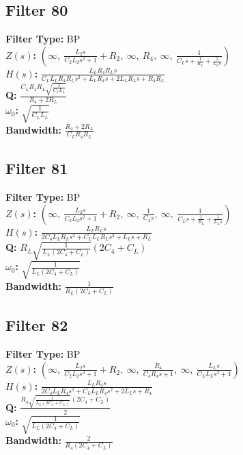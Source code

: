 \documentclass{article}
\begin{document}
\subsection*{Filter 80}
\textbf{Filter Type:} BP \\ 
\textbf{$Z(s)$:} $\left( \infty, \  \frac{L_{2} s}{C_{2} L_{2} s^{2} + 1} + R_{2}, \  \infty, \  R_{4}, \  \infty, \  \frac{1}{C_{L} s + \frac{1}{R_{L}} + \frac{1}{L_{L} s}}\right)$ \\ 
\textbf{$H(s)$:} $\frac{L_{L} R_{4} R_{L} s}{C_{L} L_{L} R_{4} R_{L} s^{2} + L_{L} R_{4} s + 2 L_{L} R_{L} s + R_{4} R_{L}}$ \\ 
\textbf{Q:} $\frac{C_{L} R_{4} R_{L} \sqrt{\frac{1}{C_{L} L_{L}}}}{R_{4} + 2 R_{L}}$ \\ 
\textbf{$\omega_0$:} $\sqrt{\frac{1}{C_{L} L_{L}}}$ \\ 
\textbf{Bandwidth:} $\frac{R_{4} + 2 R_{L}}{C_{L} R_{4} R_{L}}$ \\ 
\subsection*{Filter 81}
\textbf{Filter Type:} BP \\ 
\textbf{$Z(s)$:} $\left( \infty, \  \frac{L_{2} s}{C_{2} L_{2} s^{2} + 1} + R_{2}, \  \infty, \  \frac{1}{C_{4} s}, \  \infty, \  \frac{1}{C_{L} s + \frac{1}{R_{L}} + \frac{1}{L_{L} s}}\right)$ \\ 
\textbf{$H(s)$:} $\frac{L_{L} R_{L} s}{2 C_{4} L_{L} R_{L} s^{2} + C_{L} L_{L} R_{L} s^{2} + L_{L} s + R_{L}}$ \\ 
\textbf{Q:} $R_{L} \sqrt{\frac{1}{L_{L} \left(2 C_{4} + C_{L}\right)}} \left(2 C_{4} + C_{L}\right)$ \\ 
\textbf{$\omega_0$:} $\sqrt{\frac{1}{L_{L} \left(2 C_{4} + C_{L}\right)}}$ \\ 
\textbf{Bandwidth:} $\frac{1}{R_{L} \left(2 C_{4} + C_{L}\right)}$ \\ 
\subsection*{Filter 82}
\textbf{Filter Type:} BP \\ 
\textbf{$Z(s)$:} $\left( \infty, \  \frac{L_{2} s}{C_{2} L_{2} s^{2} + 1} + R_{2}, \  \infty, \  \frac{R_{4}}{C_{4} R_{4} s + 1}, \  \infty, \  \frac{L_{L} s}{C_{L} L_{L} s^{2} + 1}\right)$ \\ 
\textbf{$H(s)$:} $\frac{L_{L} R_{4} s}{2 C_{4} L_{L} R_{4} s^{2} + C_{L} L_{L} R_{4} s^{2} + 2 L_{L} s + R_{4}}$ \\ 
\textbf{Q:} $\frac{R_{4} \sqrt{\frac{1}{L_{L} \left(2 C_{4} + C_{L}\right)}} \left(2 C_{4} + C_{L}\right)}{2}$ \\ 
\textbf{$\omega_0$:} $\sqrt{\frac{1}{L_{L} \left(2 C_{4} + C_{L}\right)}}$ \\ 
\textbf{Bandwidth:} $\frac{2}{R_{4} \left(2 C_{4} + C_{L}\right)}$ \\ 
\end{document}
